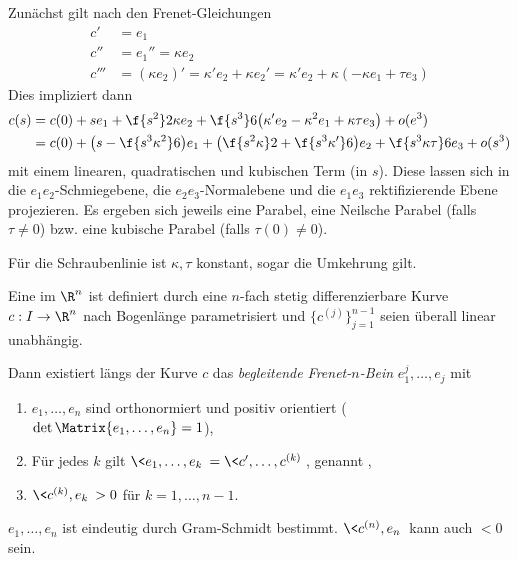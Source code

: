 Zunächst gilt nach den Frenet-Gleichungen
\begin{align*}
	c' &= e_1 \\
	c'' &= e_1'' = \kappa e_2 \\
	c''' &= (\kappa e_2)' = \kappa' e_2 + \kappa e_2' = \kappa' e_2 + \kappa(-\kappa e_1 + \tau e_3)
\end{align*}
Dies impliziert dann
\begin{align*}
	c(s) &= c(0) + se_1 + \f {s^2}2 \kappa e_2 + \f {s^3}6 \big( \kappa' e_2 - \kappa^2 e_1 + \kappa \tau e_3 \big) + o(e^3) \\
	&= c(0) + \big( s - \f {s^3 \kappa^2}6 \big) e_1 + \big( \f {s^2 \kappa}2 + \f {s^3\kappa'}6 \big) e_2 + \f{s^3 \kappa \tau}6 e_3 + o(s^3)
\end{align*}
mit einem linearen, quadratischen und kubischen Term (in $s$).
Diese lassen sich in die $e_1e_2$-Schmiegebene, die $e_2e_3$-Normalebene und die $e_1e_3$ rektifizierende Ebene projezieren.
Es ergeben sich jeweils eine Parabel, eine Neilsche Parabel (falls $\tau \neq 0$) bzw. eine kubische Parabel (falls $\tau(0) \neq 0$).


Für die Schraubenlinie ist $\kappa, \tau$ konstant, sogar die Umkehrung gilt.




\begin{df}
	Eine  im $\R^n$ ist definiert durch eine $n$-fach stetig differenzierbare Kurve $c:I \to \R^n$ nach Bogenlänge parametrisiert und $\{c^{(j)}\}_{j=1}^{n-1}$ seien überall linear unabhängig.

	Dann existiert längs der Kurve $c$ das \emph{begleitende Frenet-$n$-Bein} $e_1^{j}, \dotsc, e_{j}$ mit
	\begin{enumerate}[1)]
		\item
			$e_1, \dotsc, e_n$ sind orthonormiert und positiv orientiert ($\det \Matrix{e_1, \dotsc, e_n} = 1$),
		\item
			Für jedes $k$ gilt $\<e_1, \dotsc, e_k\> = \<c', \dotsc, c^{(k)}\>$, genannt ,
		\item
			$\<c^{(k)}, e_k\> > 0$ für $k = 1, \dotsc, n-1$.
	\end{enumerate}
	\begin{note}
		$e_1, \dotsc, e_n$ ist eindeutig durch Gram-Schmidt bestimmt.
		$\<c^{(n)}, e_n\>$ kann auch $< 0$ sein.
	\end{note}
\end{df}


